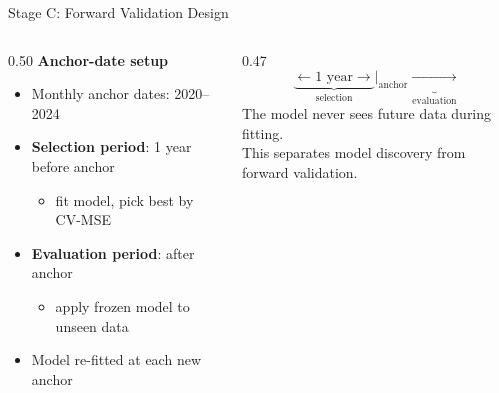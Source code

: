 \documentclass[aspectratio=169]{beamer}
\begin{document}
\begin{frame}{Stage C: Forward Validation Design}
  \begin{columns}[T]
    \begin{column}{0.50\textwidth}
      \textbf{Anchor-date setup}
      \vspace{0.4em}
      \begin{itemize}
        \item Monthly anchor dates: 2020--2024
        \item \textbf{Selection period}: 1 year before anchor
        \begin{itemize}
          \item fit model, pick best by CV-MSE
        \end{itemize}
        \item \textbf{Evaluation period}: after anchor
        \begin{itemize}
          \item apply frozen model to unseen data
        \end{itemize}
        \item Model re-fitted at each new anchor
      \end{itemize}
    \end{column}
    \begin{column}{0.47\textwidth}
      \vspace{1.5em}
      \[
        \underbrace{\longleftarrow\text{1 year}\longrightarrow}_{\text{selection}}
        \Big|_{\text{anchor}}
        \underbrace{\longrightarrow}_{\text{evaluation}}
      \]
      \vspace{0.8em}
      \small
      The model never sees future data during fitting.\\[0.5em]
      This separates model discovery from forward validation.
    \end{column}
  \end{columns}
\end{frame}
\end{document}
